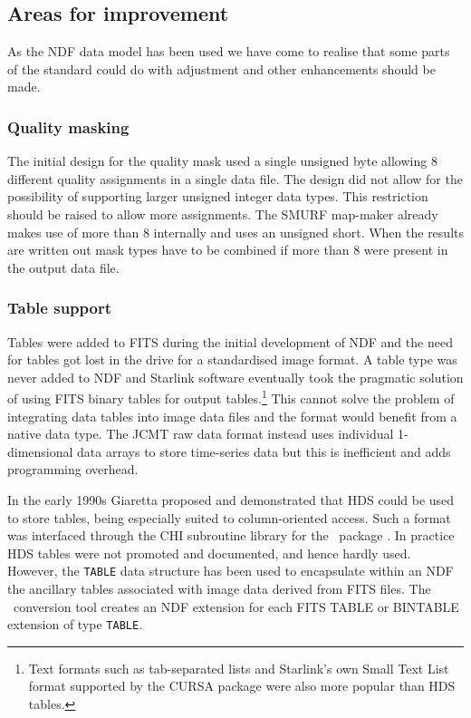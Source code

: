 \documentclass[final,authoryear,5p,times,twocolumn]{elsarticle}
\begin{document}
\subsection{Areas for improvement}

As the NDF data model has been used we have come to realise that some
parts of the standard could do with adjustment and other enhancements
should be made.

\subsubsection{Quality masking}

The initial design for the quality mask used a single unsigned byte
allowing 8 different quality assignments in a single data file. The
design did not allow for the possibility of supporting larger unsigned
integer data types. This restriction should be raised to allow more
assignments. The SMURF map-maker
\citep[][]{2013MNRAS.430.2545C} already makes use of more
than 8 internally and uses an unsigned short. When the results are
written out mask types have to be combined if more than 8 were present
in the output data file.

\subsubsection{Table support}

Tables were added to FITS \citep{1988A&AS...73..365H} during the
initial development of NDF and the need for tables got lost in the
drive for a standardised image format. A table type was never added to
NDF and Starlink software eventually took the pragmatic solution of
using FITS binary tables \citep{1995A&AS..113..159C} for output
tables.\footnote{Text formats such as tab-separated lists and
Starlink's own Small Text List format supported by the CURSA package
\citep{2001ASPC..232..314D} were also more popular than HDS tables.}
This cannot solve the problem of integrating data tables into image
data files and the format would benefit from a native data type. The
JCMT raw data format instead uses individual 1-dimensional data arrays
to store time-series data but this is inefficient and adds programming
overhead.

In the early 1990s Giaretta proposed and demonstrated that HDS could
be used to store tables, being especially suited to column-oriented
access.  Such a format was interfaced through the CHI subroutine
library \citep{SUN119} for the \catpac\ package \citep{SUN120}.  In
practice HDS tables were not promoted and documented, and hence hardly
used.  However, the \texttt{TABLE} data structure has been used to
encapsulate within an NDF the ancillary tables associated with image
data derived from FITS files.  The \fitstondf\ conversion tool
\citep{SUN55} creates an NDF extension for each FITS TABLE or BINTABLE
extension of type \texttt{TABLE}.
\end{document}
